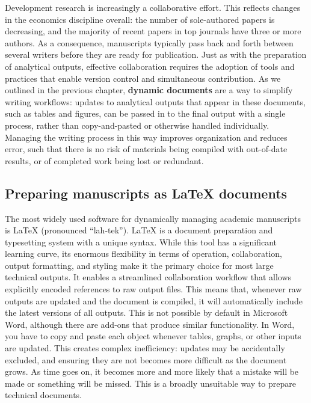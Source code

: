 Development research is increasingly a collaborative effort.
This reflects changes in the economics discipline overall:
the number of sole-authored papers is decreasing,
and the majority of recent papers in top journals have three or more
authors.
As a consequence, manuscripts typically pass back and forth between several writers
before they are ready for publication.
Just as with the preparation of analytical outputs,
effective collaboration requires the adoption of tools and practices
that enable version control and simultaneous contribution.
As we outlined in the previous chapter,
\textbf{dynamic documents} are a way to simplify writing workflows:
updates to analytical outputs that appear in these documents, such as tables and figures,
can be passed in to the final output with a single process,
rather than copy-and-pasted or otherwise handled individually.
Managing the writing process in this way
improves organization and reduces error,
such that there is no risk of materials being compiled
with out-of-date results, or of completed work being lost or redundant.

\subsection{Preparing manuscripts as {\LaTeX} documents}

The most widely used software
for dynamically managing academic manuscripts is {\LaTeX} (pronounced ``lah-tek'').
\index{\LaTeX}
{\LaTeX} is a document preparation and typesetting system with a unique syntax.
While this tool has a significant learning curve,
its enormous flexibility in terms of operation, collaboration, output formatting, and styling
make it the primary choice for most large technical outputs.
It enables a streamlined collaboration workflow
that allows explicitly encoded references to raw output files.
This means that, whenever raw outputs are updated and the document is compiled,
it will automatically include the latest versions of all outputs.
This is not possible by default in Microsoft Word,
although there are add-ons that produce similar functionality.
In Word, you have to copy and paste each object
whenever tables, graphs, or other inputs are updated.
This creates complex inefficiency: updates may be accidentally excluded,
and ensuring they are not becomes more difficult as the document grows.
As time goes on, it becomes more and more likely
that a mistake will be made or something will be missed.
This is a broadly unsuitable way to prepare technical documents.

